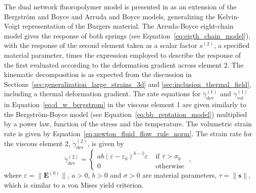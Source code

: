 The dual network fluoropolymer model is presented in \cite{bergstromConstitutiveModelPredicting2005} as an extension of the Bergström and Boyce \citep{bergstromConstitutiveModelingLarge1998} and Arruda and Boyce \citep{arrudaEffectsStrainRate1995} models, generalizing the Kelvin-Voigt representation of the Burgers material.
The Arruda-Boyce eight-chain model gives the response of both springs (see Equation~\eqref{eq:eigth_chain_model}), with the response of the second element taken as a scalar factor $s^{(2)}$, a specified material parameter, times the expression employed to describe the response of the first evaluated according to the deformation gradient across element 2.
The kinematic decomposition is as expected from the discussion in Sections~\ref{sec:generalization_large_strains_3d} and \ref{sec:inclusion_thermal_field}, including a thermal deformation gradient.
The rate equations for $\dot\gamma^{(1)}_\text{dev}$ and $\dot\gamma^{(1)}_\text{vol}$ in Equation~\eqref{eq:d_w_bergstrom} in the viscous element 1 are given similarly to the Bergström-Boyce model (see Equation~\eqref{eq:bb_reptation_model}) multiplied by a power law, function of the stress and the temperature.
The volumetric strain rate is given by Equation~\eqref{eq:newton_fluid_flow_rule_norm}.
The strain rate for the viscous element $2$, $\dot \gamma^{(2)}_\text{dev}$, is given by
\begin{equation}
	\dot{\gamma}_\text{dev}^{(2)}=\begin{cases}
	a b\left(\varepsilon-\varepsilon_0\right)^{b-1} \dot{\varepsilon} & \text { if } \tau>\sigma_0 \\
	0 & \text { otherwise }
	\end{cases},
\end{equation}
where $\varepsilon = \|\bm E^{(0)}\|$, $a >0$, $b>0$ and $\sigma>0$ are material parameters, $\tau = \|\bm s\|$, which is similar to a von Mises yield criterion.

